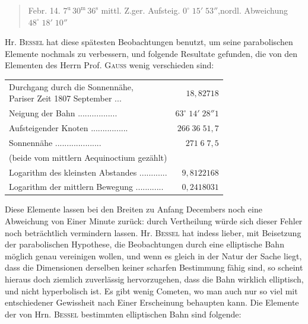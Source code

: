 \begin{quote}
Febr. 14. $7^{\text{u}}\,30^{\text{m}}\,36^{\text{s}}$ mittl. Z.\quad ger. Aufsteig. $0^\circ\;15'\;53''$,\quad nordl. Abweichung $48^\circ\;18'\;10''$
\end{quote}

\par\indent Hr. \textsc{Bessel} hat diese spätesten Beobachtungen benutzt, um seine parabolischen Elemente
nochmals zu verbessern, und folgende Resultate gefunden, die von den Elementen des Herrn
Prof. \textsc{Gauss} wenig verschieden sind:


\begin{center}\fontsize{9}{11}\selectfont\setlength{\tabcolsep}{3pt}\renewcommand{\arraystretch}{1.15}\begin{tabular}{lr}
\shortstack[l]{Durchgang durch die Sonnennähe,\\Pariser Zeit 1807 September} .\;.\;.\; & $18{,}82718$\\
Neigung der Bahn .\;.\;.\;.\;.\;.\;.\;.\;.\;.\;.\;.\;.\;.\;.\;.\;.\; & $63^\circ\;14'\;28''1$\\
Aufsteigender Knoten .\;.\;.\;.\;.\;.\;.\;.\;.\;.\;.\;.\;.\;.\;.\;.\; & $266\;36\;51{,}7$\\
Sonnennähe .\;.\;.\;.\;.\;.\;.\;.\;.\;.\;.\;.\;.\;.\;.\;.\;.\;.\;.\;.\; & $271\;6\;7{,}5$\\
\multicolumn{2}{l}{(beide vom mittlern Aequinoctium gezählt)}\\
Logarithm des kleinsten Abstandes .\;.\;.\;.\;.\;.\;.\;.\;.\;.\;.\;.\; & $9{,}8122168$\\
Logarithm der mittlern Bewegung .\;.\;.\;.\;.\;.\;.\;.\;.\;.\;.\;.\; & $0{,}2418031$\\
\end{tabular}\end{center}


\par\indent Diese Elemente lassen bei den Breiten zu Anfang Decembers noch eine Abweichung von Einer
Minute zurück: durch Vertheilung würde sich dieser Fehler noch beträchtlich vermindern
lassen. Hr. \textsc{Bessel} hat indess lieber, mit Beisetzung der parabolischen Hypothese, die
Beobachtungen durch eine elliptische Bahn möglich genau vereinigen wollen, und wenn es
gleich in der Natur der Sache liegt, dass die Dimensionen derselben keiner scharfen
Bestimmung fähig sind, so scheint hieraus doch ziemlich zuverlässig hervorzugehen, dass
die Bahn wirklich elliptisch, und nicht hyperbolisch ist. Es gibt wenig Cometen, wo man
auch nur so viel mit entschiedener Gewissheit nach Einer Erscheinung behaupten kann. Die
Elemente der von Hrn. \textsc{Bessel} bestimmten elliptischen Bahn sind folgende:


